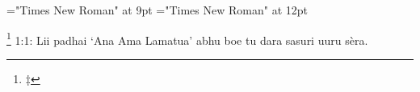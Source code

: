 \documentclass{article}
\begin{document}
 
\font\footnotescriptureText="Times New Roman" at 9pt
\font\scriptureText="Times New Roman" at 12pt

  \footnote {‡} {1:1: Lii padhai ‘Ana Ama Lamatua’ abhu boe tu dara sasuri uuru
                  sèra.}
\end{document}
